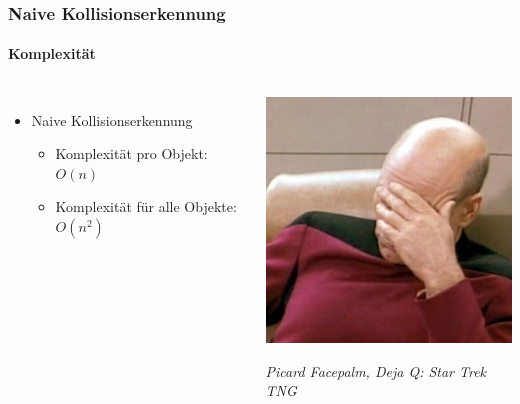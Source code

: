\documentclass{beamer}
\begin{document}
\begin{frame}
  \frametitle{Naive Kollisionserkennung}
  \framesubtitle{Komplexität}
  \begin{columns}
      \begin{itemize}
        \item Naive Kollisionserkennung
        \begin{itemize}
          \item Komplexität pro Objekt: $O(n)$
          \item Komplexität für alle Objekte: $O(n^2)$
        \end{itemize}
      \end{itemize}
      \begin{center}
        \includegraphics[scale=0.75]{rsrc/facepalm}
        
        \tiny \it Picard Facepalm, Deja Q: Star Trek TNG
      \end{center}
  \end{columns}
\end{frame}
\end{document}
